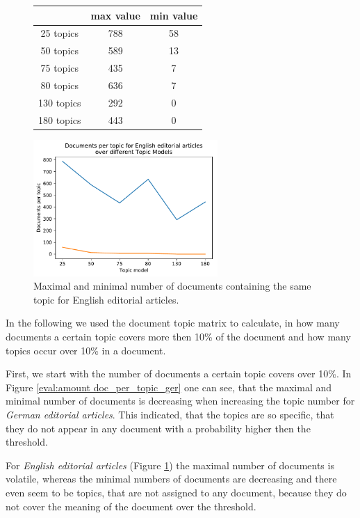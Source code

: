 \begin{figure}
	\begin{minipage}{0.5\textwidth}
		\centering
		\begin{tabular}[t]{c|cc}
			&max value & min value\\
			\hline
			25 topics&788&58\\
			50 topics&589&13\\
			75 topics&435&7\\
			80 topics&636&7\\
			130 topics &292&0\\
			180 topics&	443&0\\
		\end{tabular}
	\end{minipage}
	\begin{minipage}{0.5\textwidth}
		\centering
		\includegraphics[width=7cm]{gfx/Eval_IC/English_Editorial_Doc_per_topic.pdf}
	\end{minipage}
\caption[]{Maximal and minimal number of documents containing the same topic for English editorial articles.}
\label{eval:amount doc_per_topic_eng}
\end{figure}
In the following we used the document topic matrix to calculate, in how many documents a certain topic covers more then 10\% of the document and how many topics occur over 10\% in a document. 

First, we start with the number of documents a certain topic covers over 10\%.
In Figure \ref{eval:amount doc_per_topic_ger} one can see, that the maximal and minimal number of documents is decreasing when increasing the topic number for \textit{German editorial articles}. This indicated, that the topics are so specific, that they do not appear in any document with a probability higher then the threshold.

For \textit{English editorial articles} (Figure \ref{eval:amount doc_per_topic_eng}) the maximal number of documents is volatile, whereas the minimal numbers of documents are decreasing and there even seem to be topics, that are not assigned to any document, because they do not cover the meaning of the document over the threshold. 

